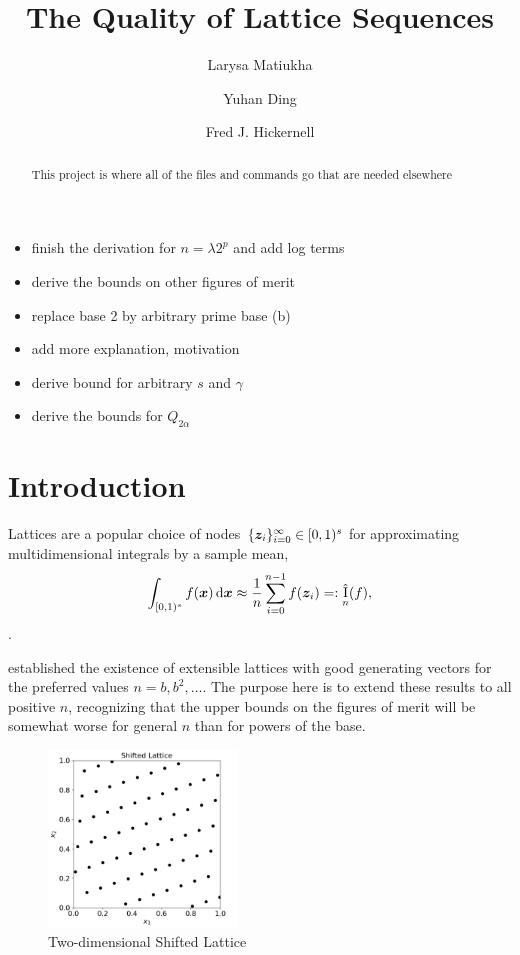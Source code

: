\documentclass[authoryear]{elsarticle}
\newcommand{\appxintn}{\appxint_n}
\DeclareMathOperator{\appxint}{\hat{I}}
\begin{document}
\title{The Quality of Lattice Sequences}
\author{Larysa Matiukha}
\author{Yuhan Ding}
\author{Fred J. Hickernell}
\begin{abstract}This project is where all of the files and commands go that are needed elsewhere
\end{abstract}

\maketitle

\begin{itemize}
    \item finish the derivation for $n = \lambda 2^p$ and add log terms 
    \item derive the bounds on other figures of merit
    \item replace base 2 by arbitrary prime base (b)
    \item add more explanation, motivation 
    \item derive bound for arbitrary $s$ and $\gamma$
    \item derive the bounds for $Q_{2\alpha}$
\end{itemize}

\section{Introduction}
Lattices are a popular choice of nodes $\{\boldsymbol{z}_i\}_{i=0}^{\infty} \in [0,1)^s$ for approximating multidimensional integrals by a sample mean,
\[
\int_{[0,1)^s} f(\vx) \, \dif \vx \approx \frac{1}{n} \sum_{i=0}^{n-1} f(\vz_i) =:\appxintn(f),
\]
\citep{DicEtal22a,Nie92,SloJoe94}.



\cite{HicNie03a} established the existence of extensible lattices with good generating vectors for the preferred values $n = b, b^2, \ldots$.  The purpose here is to extend these results to all positive $n$, recognizing that the upper bounds on the figures of merit will be somewhat worse for general $n$ than for powers of the base.

\begin{figure}[h]
\centering
\includegraphics[width=5cm,trim={0 0 0 7.5mm},clip]{shifted-lattice}
\caption{Two-dimensional Shifted Lattice}
\label{fig:enter-label}
\end{figure}
\end{document}
